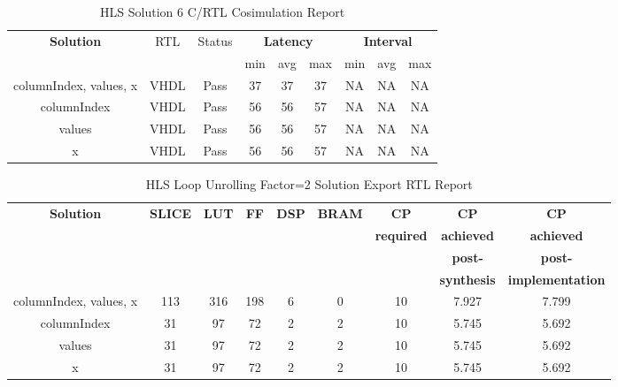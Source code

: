 \begin{table}[H]
	\centering
	\begin{tabular}{|c|c|c|c|c|c|c|c|c|}
		\hline
		\multicolumn{1}{|c|}{\textbf{Solution}} & \multicolumn{1}{|c|}{RTL} & \multicolumn{1}{|c|}{Status} & \multicolumn{3}{c|}{\textbf{Latency}} & \multicolumn{3}{c|}{\textbf{Interval}} \\
		& &  & min & avg & max & min & avg & max \\
		\hline
		columnIndex, values, x & VHDL & Pass & 37 & 37 & 37 & NA & NA & NA \\
		\hline
		columnIndex & VHDL & Pass & 56 & 56 & 57 & NA & NA & NA \\
		\hline
		values & VHDL & Pass & 56 & 56 & 57 & NA & NA & NA \\
		\hline
		x & VHDL & Pass & 56 & 56 & 57 & NA & NA & NA \\
		\hline
	\end{tabular}
	\caption{HLS Solution 6 C/RTL Cosimulation Report }
	\label{tab:hls-solution-6-cosimulation-report}
\end{table}

\begin{table}[H]
	\centering
	\begin{tabular}{|c|c|c|c|c|c|c|c|c|}
		\hline
		\textbf{Solution} & \textbf{SLICE} & \textbf{LUT} & \textbf{FF} & \textbf{DSP} & \textbf{BRAM} & \textbf{CP} & \textbf{CP} & \textbf{CP} \\
		& & & & & & \textbf{required} & \textbf{achieved} & \textbf{achieved}\\
		& & & & & & & \textbf{post-} & \textbf{post-}\\
		& & & & & & & \textbf{synthesis} & \textbf{implementation}\\
		\hline
		columnIndex, values, x  & 113 & 316 & 198 & 6 & 0 & 10 & 7.927 & 7.799 \\
		\hline
		columnIndex  & 31 & 97 & 72 & 2 & 2 & 10 & 5.745 & 5.692 \\
		\hline
		values  & 31 & 97 & 72 & 2 & 2 & 10 & 5.745 & 5.692 \\
		\hline
		x  & 31 & 97 & 72 & 2 & 2 & 10 & 5.745 & 5.692 \\
		\hline
	\end{tabular}
	\caption{HLS Loop Unrolling Factor=2 Solution Export RTL Report}
	\label{tab:hls-solution-6-export-rtl-report}
\end{table}